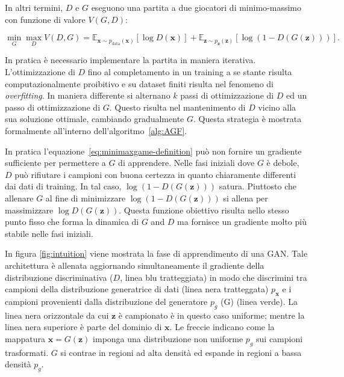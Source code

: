 In altri termini, $D$ e $G$ eseguono una partita a due giocatori di minimo-massimo con funzione di valore $V(G, D)$: 

\begin{equation}
\label{eq:minimaxgame-definition}
\min_G \max_D V(D, G) = \mathbb{E}_{\bm{x} \sim p_{\text{data}}(\bm{x})}[\log D(\bm{x})] + \mathbb{E}_{\bm{z} \sim p_{\bm{z}}(\bm{z})}[\log (1 - D(G(\bm{z})))].
\end{equation}

In pratica è necessario implementare la partita in maniera iterativa. L'ottimizzazione di $D$ fino al completamento in un training a se stante risulta computazionalmente proibitivo e su dataset finiti risulta nel fenomeno di \textit{overfitting}. In maniera differente si alternano $k$ passi di ottimizzazione di $D$ ed un passo di ottimizzazione di $G$. Questo risulta nel mantenimento di $D$ vicino alla sua soluzione ottimale, cambiando gradualmente $G$. Questa strategia è mostrata formalmente all'interno dell'algoritmo~\ref{alg:AGF}.

In pratica l'equazione~\ref{eq:minimaxgame-definition} può non fornire un gradiente sufficiente per permettere a $G$ di apprendere. Nelle fasi iniziali dove $G$ è debole, $D$ può rifiutare i campioni con buona certezza in quanto chiaramente differenti dai dati di training. In tal caso, $\log ( 1- D(G(\bm{z})))$ satura. Piuttosto che allenare $G$ al fine di minimizzare $\log (1 - D(G(\bm{z})))$ si allena per massimizzare $\log D(G(\bm{z}))$. 
Questa funzione obiettivo risulta nello stesso punto fisso che forma la dinamica di $G$ and $D$ ma fornisce un gradiente molto più stabile nelle fasi iniziali.

In figura \ref{fig:intuition} viene mostrata la fase di apprendimento di una GAN. Tale architettura è allenata aggiornando simultaneamente il gradiente della distribuzione discriminativa ($D$, linea blu tratteggiata) in modo che discrimini tra campioni della distribuzione generatrice di dati (linea nera tratteggata) $p_{\bm{x}}$ e i campioni provenienti dalla distribuzione del generatore $p_g$ (G) (linea verde).
La linea nera orizzontale da cui $\bm{z}$ è campionato è in questo caso uniforme; mentre la linea nera superiore è parte del dominio di $\bm{x}$. Le freccie indicano come la mappatura $\bm{x}=G(\bm{z})$ imponga una distribuzione non uniforme $p_g$ sui campioni trasformati. $G$ si contrae in regioni ad alta densità ed espande in regioni a bassa densità $p_g$. 

